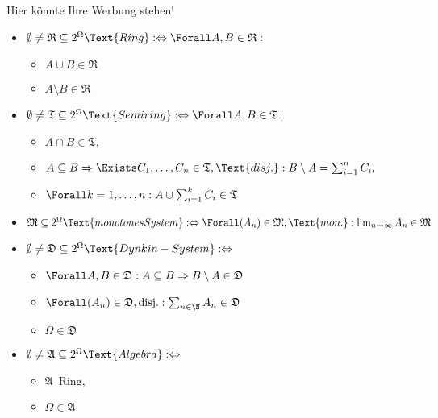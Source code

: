 \begin{solution}

Hier könnte Ihre Werbung stehen!

\begin{itemize}

  \item $\emptyset \neq \mathfrak{R} \subseteq 2^\Omega \Text{Ring} : \Leftrightarrow \Forall A, B \in \mathfrak{R}:$
  \begin{itemize}
    \item $A \cup B \in \mathfrak{R}$
    \item $A \setminus B \in \mathfrak{R}$
  \end{itemize}

  \item $\emptyset \neq \mathfrak{T} \subseteq 2^\Omega \Text{Semiring} : \Leftrightarrow \Forall A, B \in \mathfrak{T}:$
  \begin{itemize}
    \item $A \cap B \in \mathfrak{T},$
    \item $A \subseteq B \Rightarrow \Exists C_1, \ldots, C_n \in \mathfrak{T}, \Text{disj.}:
    B \setminus A = \sum_{i=1}^n C_i,$
    \item $\Forall k = 1, \ldots, n:
    A \cup \sum_{i=1}^k C_i \in \mathfrak{T}$
  \end{itemize}

  \item $\mathfrak{M} \subseteq 2^\Omega \Text{monotones System} : \Leftrightarrow \Forall (A_n) \in \mathfrak{M}, \Text{mon.}: \lim_{n \to \infty} A_n \in \mathfrak{M}$

  \item $\emptyset \neq \mathfrak{D} \subseteq 2^\Omega \Text{Dynkin-System} : \Leftrightarrow$
  \begin{itemize}
    \item $\Forall A, B \in \mathfrak{D}:
    A \subseteq B \Rightarrow B \setminus A \in \mathfrak{D}$
    \item $\Forall (A_n) \in \mathfrak{D}, \text{disj.}: \sum_{n \in \N} A_n \in \mathfrak{D}$
    \item $\Omega \in \mathfrak{D}$
  \end{itemize}

  \item $\emptyset \neq \mathfrak{A} \subseteq 2^\Omega \Text{Algebra} : \Leftrightarrow$
  \begin{itemize}
    \item $\mathfrak{A} \enspace \text{Ring},$
    \item $\Omega \in \mathfrak{A}$
  \end{itemize}


\end{itemize}
\end{solution}

